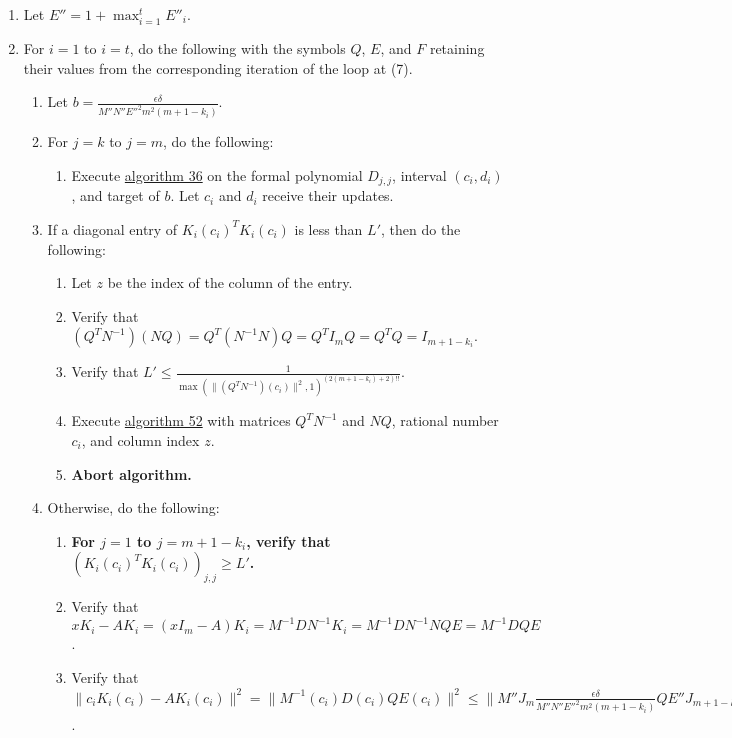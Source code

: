 \documentclass[twocolumn]{article}
\begin{document}
\begin{enumerate}
\begin{enumerate}
					\item Let $E'$ be the matrix obtained by replacing all the negative signs in $E$ with positive signs.
					\item Let $E''_i=\max_{j=1}^m\max_{l=1}^mE'(\max(\lvert c_1\rvert,\lvert d_t\rvert))_{j,l}$.
				\end{enumerate}
				\item Let $E''=1+\max_{i=1}^t E''_i$.
				\item For $i=1$ to $i=t$, do the following with the symbols $Q$, $E$, and $F$ retaining their values from the corresponding iteration of the loop at (7).
				\begin{enumerate}
					\item Let $b=\frac{\epsilon\delta}{M''N''E''^2m^2(m+1-k_i)}$.
					\item For $j=k$ to $j=m$, do the following:
					\begin{enumerate}
						\item Execute \hyperref[sec:algorithm 36]{algorithm 36} on the formal polynomial $D_{j,j}$, interval $(c_i, d_i)$, and target of $b$. Let $c_i$ and $d_i$ receive their updates.
					\end{enumerate}
					\item If a diagonal entry of ${K_i(c_i)}^TK_i(c_i)$ is less than $L'$, then do the following:
					\begin{enumerate}
						\item Let $z$ be the index of the column of the entry.
						\item Verify that $(Q^TN^{-1})(NQ)=Q^T(N^{-1}N)Q=Q^TI_mQ=Q^TQ=I_{m+1-k_i}$.
						\item Verify that $L'\le\frac{1}{\max(\lVert (Q^TN^{-1})(c_i)\rVert^2,1)^{(2(m+1-k_i)+2)!!}}$.
						\item Execute \hyperref[sec:algorithm 52]{algorithm 52} with matrices $Q^TN^{-1}$ and $NQ$, rational number $c_i$, and column index $z$.
						\item \textbf{Abort algorithm.}
					\end{enumerate}
					\item Otherwise, do the following:
					\begin{enumerate}
						\item \textbf{For $j=1$ to $j=m+1-k_i$, verify that $({K_i(c_i)}^TK_i(c_i))_{j,j}\ge L'$.}
						\item Verify that $xK_i-AK_i=(xI_m-A)K_i=M^{-1}DN^{-1}K_i=M^{-1}DN^{-1}NQE=M^{-1}DQE$.
						\item Verify that $\lVert c_iK_i(c_i)-AK_i(c_i)\rVert^2=\lVert M^{-1}(c_i)D(c_i)QE(c_i)\rVert^2\le\lVert M''J_m\frac{\epsilon\delta}{M''N''E''^2m^2(m+1-k_i)}QE''J_{m+1-k}\rVert^2=\lVert J_m\frac{\epsilon\delta}{N''E''m^2(m+1-k_i)}QJ_{m+1-k}\rVert^2=\lVert \frac{\epsilon\delta}{N''E''m^2}J_{m\times (m+1-k_i)}\rVert^2\le\lVert \frac{\epsilon\delta}{N''E''m^2}J_{m\times (m+1-k_i)}\rVert^2=\frac{m+1-k_i}{m^3}\cdot\frac{\epsilon^2\delta^2}{(N''E'')^2}$.

\end{enumerate}
\end{enumerate}
\end{enumerate}
\end{document}
